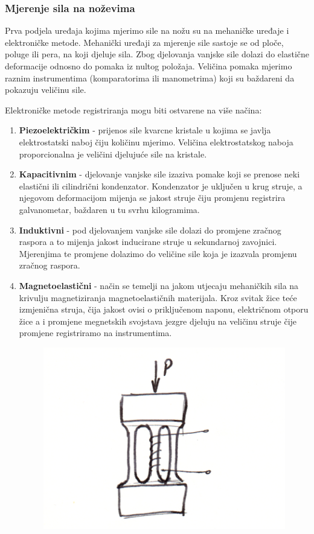 \documentclass[a4paper,12pt]{article}
\numberwithin{figure}{section}
\begin{document}
\subsubsection{Mjerenje sila na noževima}
Prva podjela uređaja kojima mjerimo sile na nožu su na mehaničke uređaje i elektroničke metode. Mehanički uređaji za mjerenje sile sastoje se od ploče, poluge ili pera, na koji djeluje sila. Zbog djelovanja vanjske sile dolazi do elastične deformacije odnosno do pomaka iz nultog položaja. Veličina pomaka mjerimo raznim instrumentima (komparatorima ili manometrima) koji su baždareni da pokazuju veličinu sile.\par
Elektroničke metode registriranja mogu biti ostvarene na više načina:
\begin{enumerate}
\item \textbf{Piezoelektričkim} - prijenos sile kvarcne kristale u kojima se javlja elektrostatski naboj čiju količinu mjerimo. Veličina elektrostatskog naboja proporcionalna je veličini djelujuće sile na kristale.
\item \textbf{Kapacitivnim} - djelovanje vanjske sile izaziva pomake koji se prenose neki elastični ili cilindrični kondenzator. Kondenzator je uključen u krug struje, a njegovom deformacijom mijenja se jakost struje čiju promjenu registrira galvanometar, baždaren u tu svrhu kilogramima.
\item \textbf{Induktivni} - pod djelovanjem vanjske sile dolazi do promjene zračnog raspora a to mijenja jakost inducirane struje u sekundarnoj zavojnici. Mjerenjima te promjene dolazimo do veličine sile koja je izazvala promjenu zračnog raspora.
\item \textbf{Magnetoelastični} - način se temelji na jakom utjecaju mehaničkih sila na krivulju magnetiziranja magnetoelastičnih materijala. Kroz svitak žice teće izmjenična struja, čija jakost ovisi o priključenom naponu, električnom otporu žice a i promjene megnetskih svojstava jezgre djeluju na veličinu struje čije promjene registriramo na instrumentima.
\begin{figure}[!h]
\includegraphics[scale=0.2]{image_10-1.png}

\end{figure}
\end{enumerate}
\end{document}
